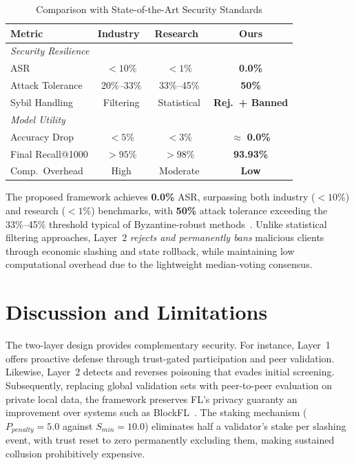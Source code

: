 \documentclass[conference]{IEEEtran}
\begin{document}
\begin{table}[t]
\centering
\caption{Comparison with State-of-the-Art Security Standards}
\label{tab:sota}
\scriptsize
\setlength{\tabcolsep}{3pt}
\begin{tabular}{lccc}
\toprule
\textbf{Metric} & \textbf{Industry}~\cite{asiri2023understanding,jayagopal2023intrusion} & \textbf{Research}~\cite{jebreel2023fl,huang2024federated,alashhab2024enhancing} & \textbf{Ours} \\
\midrule
\multicolumn{4}{l}{\textit{Security Resilience}} \\
ASR & $< 10\%$ & $< 1\%$ & \textbf{0.0\%} \\
Attack Tolerance & 20\%--33\% & 33\%--45\% & \textbf{50\%} \\
Sybil Handling & Filtering & Statistical & \textbf{Rej.\ + Banned} \\
\midrule
\multicolumn{4}{l}{\textit{Model Utility}} \\
Accuracy Drop & $< 5\%$ & $< 3\%$ & $\approx$ \textbf{0.0\%} \\
Final Recall@1000 & $> 95\%$ & $> 98\%$ & \textbf{93.93\%} \\
Comp.\ Overhead & High & Moderate & \textbf{Low} \\
\bottomrule
\end{tabular}
\end{table}

The proposed framework achieves \textbf{0.0\%} ASR, surpassing both industry ($<10\%$) and research ($<1\%$) benchmarks, with \textbf{50\%} attack tolerance exceeding the 33\%--45\% threshold typical of Byzantine-robust methods~\cite{huang2024federated}. Unlike statistical filtering approaches, Layer~2 \emph{rejects and permanently bans} malicious clients through economic slashing and state rollback, while maintaining low computational overhead due to the lightweight median-voting consensus.

\section{Discussion and Limitations}

The two-layer design provides complementary security. For instance, Layer~1 offers proactive defense through trust-gated participation and peer validation. Likewise, Layer~2 detects and reverses poisoning that evades initial screening. Subsequently, replacing global validation sets with peer-to-peer evaluation on private local data, the framework preserves FL's privacy guaranty an improvement over systems such as BlockFL~\cite{kim2019blockfl}. The staking mechanism ($P_{penalty} = 5.0$ against $S_{min} = 10.0$) eliminates half a validator's stake per slashing event, with trust reset to zero permanently excluding them, making sustained collusion prohibitively expensive.
\end{document}

